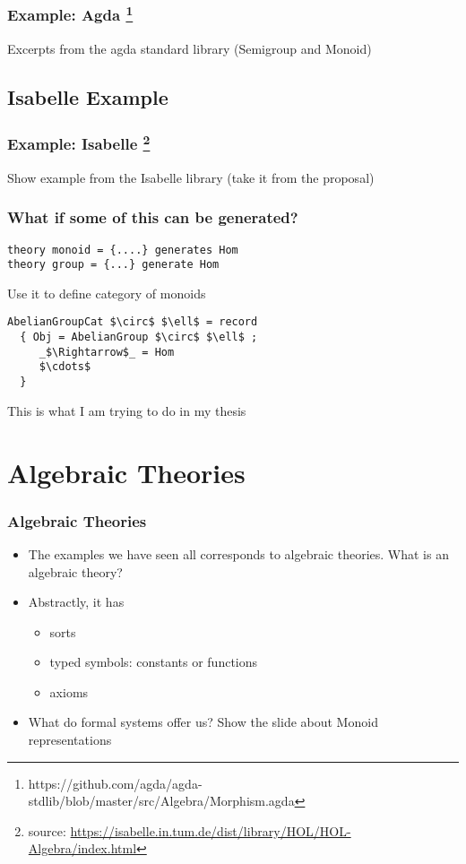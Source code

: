 \documentclass[t,12pt,numbers,fleqn,usenames,xcolor=dvipsnames]{beamer}
\begin{document}
\begin{frame}
\frametitle{Example: Agda \footnote{https://github.com/agda/agda-stdlib/blob/master/src/Algebra/Morphism.agda}}
Excerpts from the agda standard library (Semigroup and Monoid) 
\end{frame}

\subsection{Isabelle Example}
\begin{frame}
\frametitle{Example: Isabelle \footnote{source: \url{https://isabelle.in.tum.de/dist/library/HOL/HOL-Algebra/index.html}}}
Show example from the Isabelle library (take it from the proposal)
\end{frame}

\begin{frame}[fragile]
\frametitle{What if some of this can be generated?}
\begin{lstlisting}
theory monoid = {....} generates Hom 
theory group = {...} generate Hom 
\end{lstlisting}
Use it to define category of monoids 
\begin{lstlisting}
AbelianGroupCat $\circ$ $\ell$ = record 
  { Obj = AbelianGroup $\circ$ $\ell$ ; 
     _$\Rightarrow$_ = Hom
     $\cdots$
  }
\end{lstlisting}
This is what I am trying to do in my thesis 
\end{frame}

\section{Algebraic Theories}
\begin{frame}
\frametitle{Algebraic Theories}
\begin{itemize}
	\item The examples we have seen all corresponds to algebraic theories. What is an algebraic theory?
	\item Abstractly, it has
	   \begin{itemize}
	   	\item sorts
	   	\item typed symbols: constants or functions 
	   	\item axioms 
	   \end{itemize}
   \item What do formal systems offer us? Show the slide about Monoid representations 
\end{itemize}
\end{frame}
\end{document}
